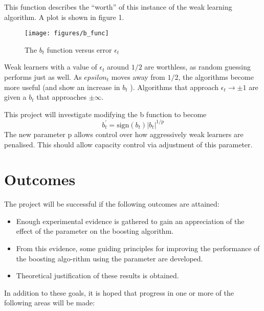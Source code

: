 	This function describes the ``worth'' of this instance of the weak
learning algorithm.  A plot is shown in figure 1.

\begin{figure}
\begin{center}
\texttt{[image: figures/b\_func]}
\end{center}
\caption{The $b_t$ function versus error $\epsilon_t$}
\end{figure}
 
Weak learners with a value of $\epsilon_t$ around $1/2$ are worthless,
as random guessing performs just as well.  As $epsilon_t$ moves away
from $1/2$, the algorithms become more useful (and show an increase in
$b_t$ ).  Algorithms that approach $\epsilon_t \rightarrow \pm 1$ are
given a $b_t$  that approaches $\pm \infty$.

This project will investigate modifying the b function to become
\begin{equation}
b^{\prime}_t = \mathrm{sign}(b_t) |b_t|^{1/p}
\end{equation}
The new parameter p allows control over how aggressively weak learners
are penalised.  This should allow capacity control via adjustment of
this parameter.

\section{Outcomes}
The project will be successful if the following outcomes are attained:

\begin{itemize}
\item	Enough experimental evidence is gathered to gain an
	appreciation of the effect of the   parameter on the boosting
	algorithm.

\item	From this evidence, some guiding principles for improving the
	performance of the boosting algo-rithm using the   parameter
	are developed.

\item	Theoretical justification of these results is obtained.
\end{itemize}

In addition to these goals, it is hoped that progress in one or more of the following areas will be made:

